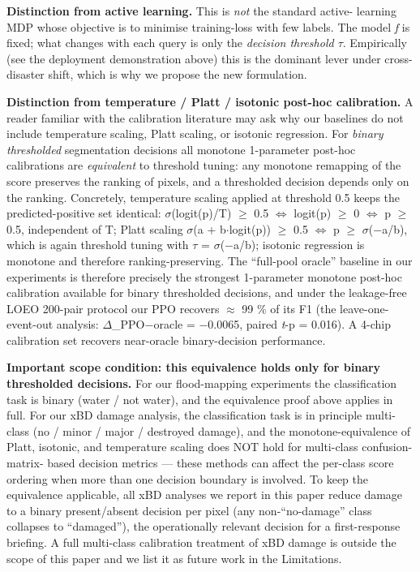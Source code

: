 \textbf{Distinction from active learning.} This is \emph{not} the standard active-
learning MDP whose objective is to minimise training-loss with few labels.
The model \emph{f} is fixed; what changes with each query is only the
\emph{decision threshold $\tau$}. Empirically (see the deployment demonstration above) this is the dominant lever
under cross-disaster shift, which is why we propose the new formulation.

\textbf{Distinction from temperature / Platt / isotonic post-hoc calibration.} A
reader familiar with the calibration literature may ask why our baselines do
not include temperature scaling, Platt scaling, or isotonic regression. For
\emph{binary thresholded} segmentation decisions all monotone 1-parameter
post-hoc calibrations are \emph{equivalent} to threshold tuning: any monotone
remapping of the score preserves the ranking of pixels, and a thresholded
decision depends only on the ranking. Concretely, temperature scaling
applied at threshold 0.5 keeps the predicted-positive set identical:
$\sigma$(logit(p)/T) $\geq$ 0.5 $\Leftrightarrow$ logit(p) $\geq$ 0 $\Leftrightarrow$ p $\geq$ 0.5, independent of T; Platt
scaling $\sigma$(a + b$\cdot$logit(p)) $\geq$ 0.5 $\Leftrightarrow$ p $\geq$ $\sigma$($-$a/b), which is again threshold
tuning with $\tau$ = $\sigma$($-$a/b); isotonic regression is monotone and therefore
ranking-preserving. The ``full-pool oracle'' baseline in our experiments is
therefore precisely the strongest 1-parameter monotone post-hoc calibration
available for binary thresholded decisions, and under the leakage-free
LOEO 200-pair protocol our PPO recovers $\approx$ 99 \% of its F1 (the leave-one-event-out analysis:
$\Delta$\_PPO$-$oracle = $-$0.0065, paired \emph{t}-p = 0.016). A 4-chip
calibration set recovers near-oracle binary-decision performance.

\textbf{Important scope condition: this equivalence holds only for binary
thresholded decisions.} For our flood-mapping experiments the
classification task is binary (water / not water), and the equivalence
proof above applies in full. For our xBD damage analysis, the
classification task is in principle multi-class (no / minor / major /
destroyed damage), and the monotone-equivalence of Platt, isotonic, and
temperature scaling does NOT hold for multi-class confusion-matrix-
based decision metrics --- these methods can affect the per-class score
ordering when more than one decision boundary is involved. To keep the
equivalence applicable, all xBD analyses we report in this paper
reduce damage to a binary present/absent decision per pixel (any
non-``no-damage'' class collapses to ``damaged''), the operationally
relevant decision for a first-response briefing. A full multi-class
calibration treatment of xBD damage is outside the scope of this paper
and we list it as future work in the Limitations.

